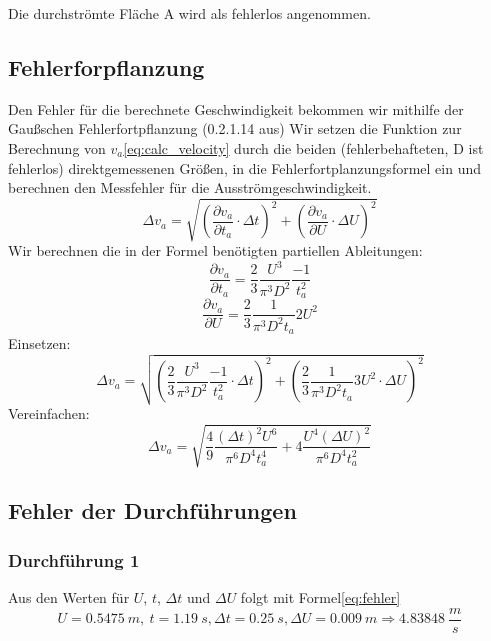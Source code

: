 \documentclass{article}
\begin{document}
            Die durchströmte Fläche A wird als fehlerlos angenommen.

        \subsection{Fehlerforpflanzung}
            Den Fehler für die berechnete Geschwindigkeit bekommen wir mithilfe der Gaußschen Fehlerfortpflanzung (0.2.1.14 aus\cite{AnleitungPraktikum})
            Wir setzen die Funktion zur Berechnung von \(v_a\)\ref{eq:calc_velocity} durch die beiden (fehlerbehafteten, D ist fehlerlos)
            direktgemessenen Größen, in die Fehlerfortplanzungsformel ein und berechnen den Messfehler für die Ausströmgeschwindigkeit. 
            \begin{equation}
                \Delta v_a = \sqrt{ {\left( \frac{ \partial v_a }{ \partial t_a } \cdot \Delta t \right)}^2 + {\left( \frac{ \partial v_a }{ \partial U } \cdot \Delta U \right)}^2 }
            \end{equation}
            Wir berechnen die in der Formel benötigten partiellen Ableitungen:
            \begin{equation}
                 \frac{\partial v_a}{ \partial t_a} = \frac{2}{3} \frac{U^3}{\pi^3 D^2} \frac{-1}{t_a^2}
            \end{equation}
            \begin{equation}
                \frac{\partial v_a}{ \partial U} = \frac{2}{3} \frac{1}{\pi^3 D^2 t_a} 2 U^2
            \end{equation}
            Einsetzen:
            \begin{equation}
                \Delta v_a = \sqrt{ {\left( \frac{2}{3} \frac{U^3}{\pi^3 D^2} \frac{-1}{t_a^2} \cdot \Delta t \right) }^2 
                + {\left( \frac{2}{3} \frac{1}{\pi^3 D^2 t_a} 3 U^2 \cdot \Delta U \right)}^2 }
            \end{equation}
            Vereinfachen:
            \begin{equation} \label{eq:fehler}
                \Delta v_a = \sqrt{ \frac{4}{9} \frac{ {(\Delta t)}^2 U^6}{\pi^6 D^4 t_a^4} + 4 \frac{U^4 {(\Delta U)}^2}{\pi^6 D^4 t_a^2}}
            \end{equation}

        \subsection{Fehler der Durchführungen}
            \subsubsection{Durchführung 1}
                Aus den Werten für \(U\), \(t\), \( \Delta t \) und \(\Delta U \) folgt mit Formel\ref{eq:fehler}
                \begin{equation}
                    U = \SI{0.5475}{m},\ t = \SI{1.19}{s}, \Delta t = \SI{0.25}{s}, \Delta U = \SI{0.009}{m} \Rightarrow \SI{4.83848}{\frac{m}{s}} 
                \end{equation}
\end{document}
